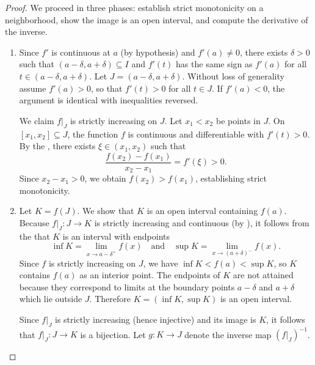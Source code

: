\begin{proof}
    We proceed in three phases: establish strict monotonicity on a neighborhood, show the image is an open interval, and compute the derivative of the inverse.

    \begin{enumerate}
        \item Since $f'$ is continuous at $a$ (by hypothesis) and $f'(a) \neq 0$, there exists $\delta > 0$ such that $(a-\delta, a+\delta) \subseteq I$ and $f'(t)$ has the same sign as $f'(a)$ for all $t \in (a-\delta, a+\delta)$. Let $J = (a-\delta, a+\delta)$. Without loss of generality assume $f'(a) > 0$, so that $f'(t) > 0$ for all $t \in J$. If $f'(a) < 0$, the argument is identical with inequalities reversed.

        We claim $f|_J$ is strictly increasing on $J$. Let $x_1 < x_2$ be points in $J$. On $[x_1, x_2] \subseteq J$, the function $f$ is continuous and differentiable with $f'(t) > 0$. By the , there exists $\xi \in (x_1, x_2)$ such that
        $$\frac{f(x_2) - f(x_1)}{x_2 - x_1} = f'(\xi) > 0.$$
        Since $x_2 - x_1 > 0$, we obtain $f(x_2) > f(x_1)$, establishing strict monotonicity.

        \item Let $K = f(J)$. We show that $K$ is an open interval containing $f(a)$. Because $f|_J : J \to K$ is strictly increasing and continuous (by ), it follows from the  that $K$ is an interval with endpoints
        $$\inf K = \lim_{x \to a-\delta^+} f(x) \quad \text{and} \quad \sup K = \lim_{x \to (a+\delta)^-} f(x).$$
        Since $f$ is strictly increasing on $J$, we have $\inf K < f(a) < \sup K$, so $K$ contains $f(a)$ as an interior point. The endpoints of $K$ are not attained because they correspond to limits at the boundary points $a-\delta$ and $a+\delta$ which lie outside $J$. Therefore $K = (\inf K, \sup K)$ is an open interval.

        Since $f|_J$ is strictly increasing (hence injective) and its image is $K$, it follows that $f|_J : J \to K$ is a bijection. Let $g : K \to J$ denote the inverse map $(f|_J)^{-1}$.


\end{enumerate}
\end{proof}
